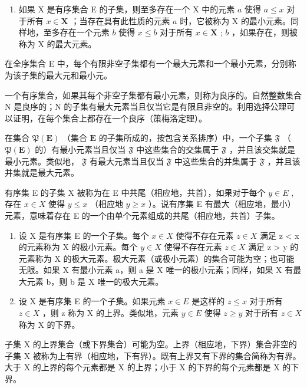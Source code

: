 \begin{enumerate}
\def\labelenumi{\arabic{enumi}.}
\setcounter{enumi}{4}
\tightlist
\item
  如果 X 是有序集合 E 的子集，则至多存在一个 X 中的元素 \(a\) 使得 \(a \leqslant x\) 对于所有 \(x \in \mathbf{X}\) ；当存在具有此性质的元素 \(a\) 时，它被称为 X 的最小元素。同样地，至多存在一个元素 \(b\) 使得 \(x \leqslant b\) 对于所有 \(x \in \mathbf{X}\) ; \(b\) ，如果存在，则被称为 X 的最大元素。
\end{enumerate}

在全序集合 E 中，每个有限非空子集都有一个最大元素和一个最小元素，分别称为该子集的最大元和最小元。

一个有序集合，如果其每个非空子集都有最小元素，则称为良序的。自然整数集合 N 是良序的；N 的子集有最大元素当且仅当它是有限且非空的。利用选择公理可以证明，在每个集合上都存在一个良序（策梅洛定理）。

在集合 \(\mathfrak{P}(\mathbf{E})\) （集合 \(\mathbf{E}\) 的子集所成的，按包含关系排序）中，一个子集 \(\mathfrak{F}\) （ \(\mathfrak{P}(\mathbf{E})\) 的）有最小元素当且仅当 \(\mathfrak{F}\) 中这些集合的交集属于 \(\mathfrak{F}\) ，并且该交集就是最小元素。类似地， \(\mathfrak{F}\) 有最大元素当且仅当 \(\mathfrak{F}\) 中这些集合的并集属于 \(\mathfrak{F}\) ，并且该并集就是最大元素。

有序集 E 的子集 X 被称为在 E 中共尾（相应地，共首），如果对于每个 \(y \in E\) , 存在 \(x \in X\) 使得 \(y \leqslant x\) （相应地 \(y \geqslant x\) ）。说有序集 E 有最大（相应地，最小）元素，意味着存在 E 的一个由单个元素组成的共尾（相应地，共首）子集。

\begin{enumerate}
\def\labelenumi{\arabic{enumi}.}
\setcounter{enumi}{5}
\item
  设 X 是有序集 E 的一个子集。每个 \(x \in X\) 使得不存在元素 \(z \in X\) 满足 z \textless{} x 的元素称为 X 的极小元素。每个 \(y \in X\) 使得不存在元素 \(z \in X\) 满足 z \textgreater{} y 的元素称为 X 的极大元素。极大元素（或极小元素）的集合可能为空；也可能无限。如果 X 有最小元素 a，则 a 是 X 唯一的极小元素；同样，如果 X 有最大元素 b，则 b 是 X 唯一的极大元素。
\item
  设 X 是有序集 E 的一个子集。如果元素 \(x \in E\) 是这样的 \(z \leqslant x\) 对于所有 \(z \in X\) ，则 z 称为 X 的上界。类似地，元素 \(y \in E\) 使得 \(z \geqslant y\) 对于所有 \(z \in X\) 称为 X 的下界。
\end{enumerate}

子集 X 的上界集合（或下界集合）可能为空。上界（相应地，下界）集合非空的子集 X 被称为上有界（相应地，下有界）。既有上界又有下界的集合简称为有界。大于 X 的上界的每个元素都是 X 的上界；小于 X 的下界的每个元素都是 X 的下界。

